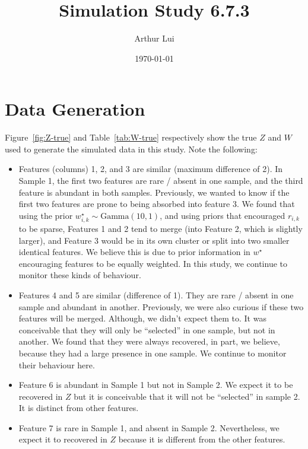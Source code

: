 \documentclass[10pt]{article} %
\title{Simulation Study 6.7.3}
\author{Arthur Lui}
\date{\today} %
\newcommand{\Gam}{ \text{Gamma} }
\begin{document}
\maketitle



\section{Data Generation}\label{sec:data-generation}
Figure~\ref{fig:Z-true} and Table~\ref{tab:W-true} respectively show the true
$Z$ and $W$ used to generate the simulated data in this study. Note the following:
\begin{itemize}
  \item Features (columns) 1, 2, and 3 are similar (maximum difference of 2).
    In Sample 1, the first two features are rare / absent in one sample, and
    the third feature is abundant in both samples. Previously, we wanted to
    know if the first two features are prone to being absorbed into feature 3. We
    found that using the prior $w^\star_{i,k} \sim \Gam(10, 1)$, and using priors
    that encouraged $r_{i,k}$ to be sparse, Features 1 and 2 tend to merge
    (into Feature 2, which is slightly larger), and Feature 3 would be in its
    own cluster or split into two smaller identical features. We believe this is 
    due to prior information in $w^\star$ encouraging features to be equally weighted.
    In this study, we continue to monitor these kinds of behaviour.
  \item Features 4 and 5 are similar (difference of 1). They are rare / absent
    in one sample and abundant in another. Previously, we were also curious if
    these two features will be merged. Although, we didn't expect them to. It was
    conceivable that they will only be ``selected'' in one sample, but not in
    another. We found that they were always recovered, in part, we believe, because
    they had a large presence in one sample. We continue to monitor their behaviour
    here.
  \item Feature 6 is abundant in Sample 1 but not in Sample 2. We expect it to be
    recovered in $Z$ but it is conceivable that it will not be ``selected'' in sample
    2. It is distinct from other features.
  \item Feature 7 is rare in Sample 1, and absent in Sample 2. Nevertheless, we
    expect it to recovered in $Z$ because it is different from the other
    features.
\end{itemize}
\end{document}
